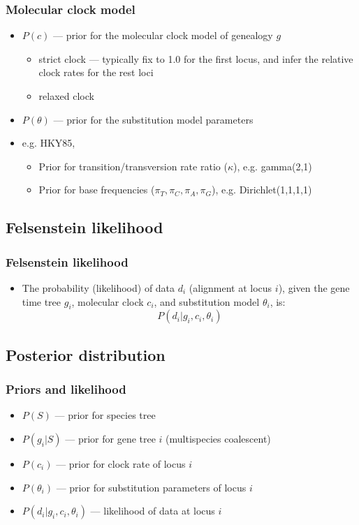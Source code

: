 \begin{frame}\frametitle{Molecular clock model}
	\begin{itemize}
		\item $P(c)$ --- prior for the molecular clock model of genealogy $g$
		\begin{itemize} 
			\item strict clock --- typically fix to 1.0 for the first locus, and infer the relative clock rates for the rest loci
			\item relaxed clock
		\end{itemize}
	\end{itemize}
	\begin{itemize}
		\item $P(\theta)$ --- prior for the substitution model parameters
		\item e.g. HKY85,
		\begin{itemize} 
			\item Prior for transition/transversion rate ratio ($\kappa$), e.g. gamma(2,1)
  			\item Prior for base frequencies ($\pi_T, \pi_C, \pi_A, \pi_G$), e.g. Dirichlet(1,1,1,1)
		\end{itemize}
	\end{itemize}
\end{frame}

\subsection{Felsenstein likelihood}

\begin{frame}\frametitle{Felsenstein likelihood}
	\begin{itemize}
		\item The probability (likelihood) of data $d_i$ (alignment at locus $i$), given the gene time tree $g_i$, molecular clock $c_i$, and substitution model $\theta_i$, is:
		\[ P(d_i|g_i,c_i,\theta_i) \]
	\end{itemize}
\end{frame}

\subsection{Posterior distribution}

\begin{frame}\frametitle{Priors and likelihood}
	\begin{itemize}
		\item $P(S)$ --- prior for species tree
		\vskip 0.4cm 
		\item $P(g_i|S)$ --- prior for gene tree $i$ (multispecies coalescent)
		\vskip 0.4cm
		\item $P(c_i)$ --- prior for clock rate of locus $i$
		\vskip 0.4cm
		\item $P(\theta_i)$ --- prior for substitution parameters of locus $i$
		\vskip 0.4cm
		\item $P(d_i|g_i,c_i,\theta_i)$ --- likelihood of data at locus $i$
	\end{itemize}
\end{frame}

